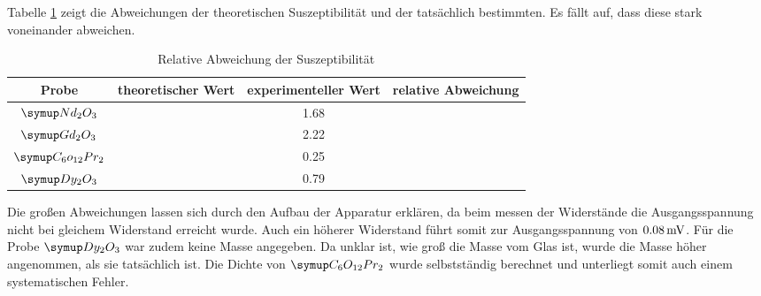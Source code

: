 Tabelle \ref{tab:rel} zeigt die Abweichungen der theoretischen Suszeptibilität und
der tatsächlich bestimmten. Es fällt auf, dass diese stark voneinander
abweichen.
\begin{table}
  \centering
  \begin{tabular}{c c c c}
    \toprule
     Probe & theoretischer Wert & experimenteller Wert & relative Abweichung \\
     \midrule
     $\su{Nd_2O_3}$       &   & 1.68 \\
     $\su{Gd_2O_3}$       &   & 2.22 \\
     $\su{C_6o_{12}Pr_2}$ &   & 0.25 \\
     $\su{Dy_2O_3}$       &   & 0.79 \\
     \bottomrule
  \end{tabular}
  \caption{Relative Abweichung der Suszeptibilität}
  \label{tab:rel}
\end{table}
Die großen Abweichungen lassen sich durch den Aufbau der Apparatur erklären, da
beim messen der Widerstände die Ausgangsspannung nicht bei gleichem Widerstand
erreicht wurde. Auch ein höherer Widerstand führt somit zur Ausgangsspannung
von $0.08\,\si{\milli\volt}$.
Für die Probe $\su{Dy_2O_3}$ war zudem keine Masse angegeben. Da unklar ist,
wie groß die Masse vom Glas ist, wurde die Masse höher angenommen, als sie
tatsächlich ist.
Die Dichte von $\su{C_6O_{12}Pr_2}$ wurde selbstständig berechnet und unterliegt
somit auch einem systematischen Fehler.
